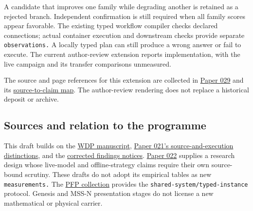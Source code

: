 \documentclass[
  11pt,
]{article}
\begin{document}
A candidate that improves one family while degrading another is retained
as a rejected branch. Independent confirmation is still required when
all family scores appear favorable. The existing typed workflow compiler
checks declared connections; actual container execution and downstream
checks provide separate \nolinkurl{observations.} A locally typed plan
can still produce a wrong answer or fail to execute. The current
author-review extension reports implementation, with the live campaign
and its transfer comparisons unmeasured.

The source and page references for this extension are collected in
\href{../029/paper.pdf}{Paper 029} and its
\href{../029/docs/source_to_claim_map.md}{source-to-claim map}. The
author-review rendering does not replace a historical deposit or
archive.

\subsection{Sources and relation to the
programme}\label{sources-and-relation-to-the-programme}

This draft builds on the
\href{https://github.com/dbccpage/the_symbol_game/blob/59dde95a7860063c25d75db37f40af556e9f28ee/atlas/coda_atlas/F004_papers/001_finite_obstruction_calculus/000_witnessed_difference_programme/witnessed_difference_programme.md}{WDP
manuscript},
\href{https://github.com/dbccpage/the_symbol_game/blob/59dde95a7860063c25d75db37f40af556e9f28ee/atlas/coda_atlas/F004_papers/015_pfp/021_recreated_demos_and_proposal_fidelity_evidence/paper.md}{Paper
021's source-and-execution distinctions}, and the
\href{https://github.com/dbccpage/the_symbol_game/blob/59dde95a7860063c25d75db37f40af556e9f28ee/atlas/coda_atlas/F004_papers/015_pfp/symbol_game_challenge_and_demos_findings/README.md}{corrected
findings notices}.
\href{https://github.com/dbccpage/the_symbol_game/blob/59dde95a7860063c25d75db37f40af556e9f28ee/atlas/coda_atlas/F004_papers/015_pfp/022_pfp_frontier_research/paper.md}{Paper
022} supplies a research design whose live-model and offline-strategy
claims require their own source-bound scrutiny. These drafts do not
adopt its empirical tables as new \nolinkurl{measurements.} The
\href{https://github.com/dbccpage/the_symbol_game/blob/59dde95a7860063c25d75db37f40af556e9f28ee/atlas/coda_atlas/F004_papers/015_pfp/README.md}{PFP
collection} provides the \nolinkurl{shared-system/typed-instance}
protocol. Genesis and MSS-N presentation stages do not license a new
mathematical or physical carrier.
\end{document}
